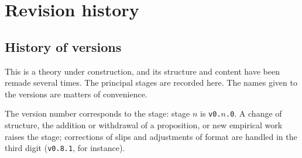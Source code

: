 \chapter{Revision history}
\label{app:revisions}

\section{History of versions}
\label{sec:version-history}

This is a theory under construction, and its structure and content have been remade several
times. The principal stages are recorded here. The names given to the versions are matters of
convenience.

The version number corresponds to the stage: stage $n$ is \texttt{v0.$n$.0}. A change of
structure, the addition or withdrawal of a proposition, or new empirical work raises the stage;
corrections of slips and adjustments of format are handled in the third digit (\texttt{v0.8.1},
for instance).

